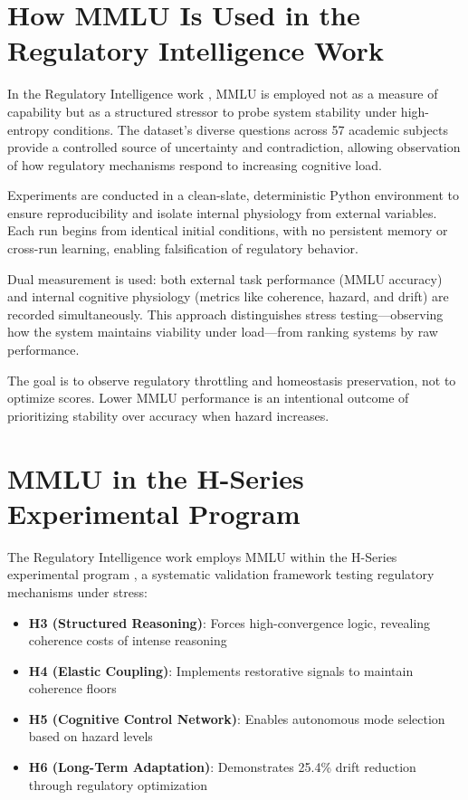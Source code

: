 \documentclass[12pt,a4paper]{report}
\begin{document}
\section{How MMLU Is Used in the Regulatory Intelligence Work}

In the Regulatory Intelligence work \cite{Cragin2026Thesis}, MMLU is employed not as a measure of capability but as a structured stressor to probe system stability under high-entropy conditions. The dataset's diverse questions across 57 academic subjects provide a controlled source of uncertainty and contradiction, allowing observation of how regulatory mechanisms respond to increasing cognitive load.

Experiments are conducted in a clean-slate, deterministic Python environment to ensure reproducibility and isolate internal physiology from external variables. Each run begins from identical initial conditions, with no persistent memory or cross-run learning, enabling falsification of regulatory behavior.

Dual measurement is used: both external task performance (MMLU accuracy) and internal cognitive physiology (metrics like coherence, hazard, and drift) are recorded simultaneously. This approach distinguishes stress testing—observing how the system maintains viability under load—from ranking systems by raw performance.

The goal is to observe regulatory throttling and homeostasis preservation, not to optimize scores. Lower MMLU performance is an intentional outcome of prioritizing stability over accuracy when hazard increases.

\section{MMLU in the H-Series Experimental Program}

The Regulatory Intelligence work employs MMLU within the H-Series experimental program \cite{Cragin2026Thesis}, a systematic validation framework testing regulatory mechanisms under stress:

\begin{itemize}
\item \textbf{H3 (Structured Reasoning)}: Forces high-convergence logic, revealing coherence costs of intense reasoning
\item \textbf{H4 (Elastic Coupling)}: Implements restorative signals to maintain coherence floors  
\item \textbf{H5 (Cognitive Control Network)}: Enables autonomous mode selection based on hazard levels
\item \textbf{H6 (Long-Term Adaptation)}: Demonstrates 25.4\% drift reduction through regulatory optimization
\end{itemize}
\end{document}
